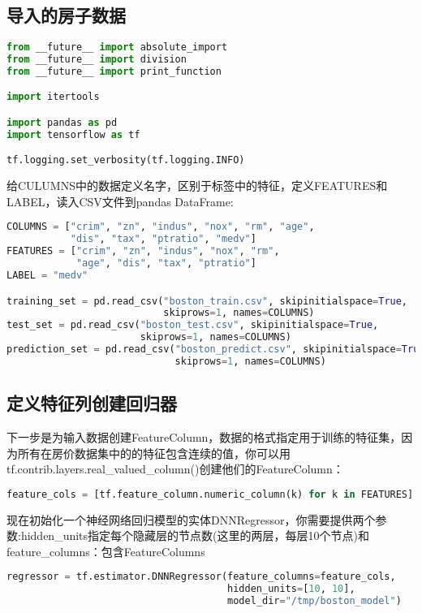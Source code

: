 \subsection{导入的房子数据}
\begin{lstlisting}[language=Python]
from __future__ import absolute_import
from __future__ import division
from __future__ import print_function

import itertools

import pandas as pd
import tensorflow as tf

tf.logging.set_verbosity(tf.logging.INFO)
\end{lstlisting}
给CULUMNS中的数据定义名字，区别于标签中的特征，定义FEATURES和LABEL，读入CSV文件到pandas DataFrame:
\begin{lstlisting}[language=Python]
COLUMNS = ["crim", "zn", "indus", "nox", "rm", "age",
           "dis", "tax", "ptratio", "medv"]
FEATURES = ["crim", "zn", "indus", "nox", "rm",
            "age", "dis", "tax", "ptratio"]
LABEL = "medv"

training_set = pd.read_csv("boston_train.csv", skipinitialspace=True,
                           skiprows=1, names=COLUMNS)
test_set = pd.read_csv("boston_test.csv", skipinitialspace=True,
                       skiprows=1, names=COLUMNS)
prediction_set = pd.read_csv("boston_predict.csv", skipinitialspace=True,
                             skiprows=1, names=COLUMNS)
\end{lstlisting}
\subsection{定义特征列创建回归器}
下一步是为输入数据创建FeatureColumn，数据的格式指定用于训练的特征集，因为所有在房价数据集中的的特征包含连续的值，你可以用tf.contrib.layers.real\_valued\_column()创建他们的FeatureColumn：
\begin{lstlisting}[language=Python]
feature_cols = [tf.feature_column.numeric_column(k) for k in FEATURES]
\end{lstlisting}
现在初始化一个神经网络回归模型的实体DNNRegressor，你需要提供两个参数:hidden\_units指定每个隐藏层的节点数(这里的两层，每层10个节点)和feature\_columns：包含FeatureColumns
\begin{lstlisting}[language=Python]
regressor = tf.estimator.DNNRegressor(feature_columns=feature_cols,
                                      hidden_units=[10, 10],
                                      model_dir="/tmp/boston_model")
\end{lstlisting}
